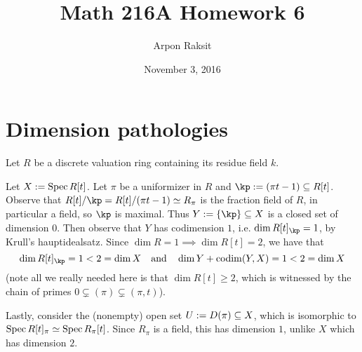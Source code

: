 

\title{Math 216A Homework 6}
\author{Arpon Raksit}
\date{November 3, 2016}




\maketitle

\newcommand{\codim}{\operatorname{codim}}


\section{Dimension pathologies}

Let $R$ be a discrete valuation ring containing its residue field $k$.

Let $X \mathrel{:=} \operatorname{Spec} R[t]$. Let $\pi$ be a uniformizer in $R$ and $\kp \ce (\pi t - 1) \subseteq R[t]$. Observe that $R[t]/\kp = R[t]/(\pi t - 1) \iso R_\pi$ is the fraction field of $R$, in particular a field, so $\kp$ is maximal. Thus $Y \ce \{\kp\} \subseteq X$ is a closed set of dimension $0$. Then observe that $Y$ has codimension $1$, i.e. $\dim R[t]_\kp = 1$, by Krull's hauptidealsatz. Since $\dim R = 1 \implies \dim R[t] = 2$, we have that
\[
\dim R[t]_\kp = 1 < 2 = \dim X \quad\text{and}\quad
\dim Y + \codim(Y,X) = 1 < 2 = \dim X
\]
(note all we really needed here is that $\dim R[t] \ge 2$, which is witnessed by the chain of primes $0 \subsetneq (\pi) \subsetneq (\pi, t)$).

Lastly, consider the (nonempty) open set $U \mathrel{:=} D(\pi) \subseteq X$, which is isomorphic to $\operatorname{Spec} R[t]_\pi \simeq \operatorname{Spec} R_\pi[t]$. Since $R_\pi$ is a field, this has dimension $1$, unlike $X$ which has dimension $2$.



